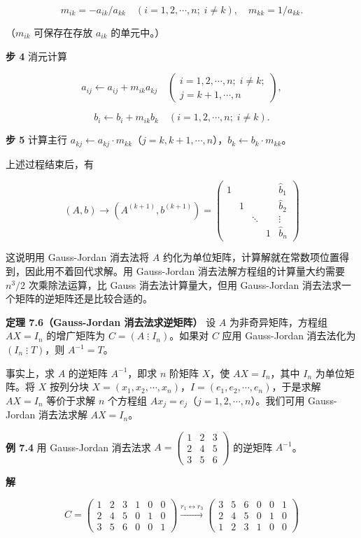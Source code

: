 \documentclass[
  10pt,
  fontset=fandol]{ctexart}
\begin{document}
\[m_{ik}=-a_{ik}/a_{kk}\quad(i=1,2,\cdots,n;\;i\ne k),\quad m_{kk}=1/a_{kk}.\]

（\(m_{ik}\) 可保存在存放 \(a_{ik}\) 的单元中。）

\textbf{步 4} 消元计算

\[a_{ij}\leftarrow a_{ij}+m_{ik}a_{kj}\quad
\left(\begin{array}{l}i=1,2,\cdots,n;\;i\ne k;\\j=k+1,\cdots,n\end{array}\right),\]

\[b_i\leftarrow b_i+m_{ik}b_k\quad(i=1,2,\cdots,n;\;i\ne k).\]

\textbf{步 5} 计算主行 \(a_{kj}\leftarrow a_{kj}\cdot m_{kk}\)（\(j=k,k+1,\cdots,n\)），\(b_k\leftarrow b_k\cdot m_{kk}\)。

上述过程结束后，有

\[
(A,b)\to(A^{(k+1)},b^{(k+1)})=
\left(\begin{array}{cccc|c}
1&&&&\widehat{b}_1\\
&1&&&\widehat{b}_2\\
&&\ddots&&\vdots\\
&&&1&\widehat{b}_n
\end{array}\right)
\]

这说明用 Gauss-Jordan 消去法将 \(A\) 约化为单位矩阵，计算解就在常数项位置得到，因此用不着回代求解。用 Gauss-Jordan 消去法解方程组的计算量大约需要 \(n^3/2\) 次乘除法运算，比 Gauss 消去法计算量大，但用 Gauss-Jordan 消去法求一个矩阵的逆矩阵还是比较合适的。

\textbf{定理 7.6（Gauss-Jordan 消去法求逆矩阵）} 设 \(A\) 为非奇异矩阵，方程组 \(AX=I_n\) 的增广矩阵为 \(C=(A\mathbin{\vdots}I_n)\)。如果对 \(C\) 应用 Gauss-Jordan 消去法化为 \((I_n\mathbin{\vdots}T)\)，则 \(A^{-1}=T\)。

事实上，求 \(A\) 的逆矩阵 \(A^{-1}\)，即求 \(n\) 阶矩阵 \(X\)，使 \(AX=I_n\)，其中 \(I_n\) 为单位矩阵。将 \(X\) 按列分块 \(X=(x_1,x_2,\cdots,x_n)\)，\(I=(e_1,e_2,\cdots,e_n)\)，于是求解 \(AX=I_n\) 等价于求解 \(n\) 个方程组 \(Ax_j=e_j\)（\(j=1,2,\cdots,n\)）。我们可用 Gauss-Jordan 消去法求解 \(AX=I_n\)。

\textbf{例 7.4} 用 Gauss-Jordan 消去法求 \(A=\begin{pmatrix}1&2&3\\2&4&5\\3&5&6\end{pmatrix}\) 的逆矩阵 \(A^{-1}\)。

\textbf{解}

\[
C=\left(\begin{array}{rrr|rrr}
1&2&3&1&0&0\\
2&4&5&0&1&0\\
3&5&6&0&0&1
\end{array}\right)
\xrightarrow{r_1\leftrightarrow r_3}
\left(\begin{array}{rrr|rrr}
\boxed{3}&5&6&0&0&1\\
2&4&5&0&1&0\\
1&2&3&1&0&0
\end{array}\right)
\]
\end{document}
